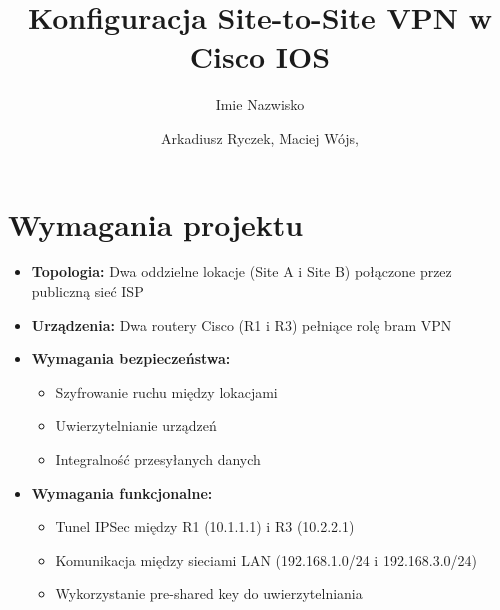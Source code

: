 \documentclass[12pt,twoside,a4paper,openany]{article}
\title{Konfiguracja Site-to-Site VPN w Cisco IOS}		%
\author{Imie Nazwisko}
\author{Arkadiusz Ryczek, Maciej Wójs,  }
\begin{document}
\renewcommand{\figurename}{Rys.}    %
\renewcommand{\tablename}{Tab.}     %
\thispagestyle{empty}               %
\stronatytulowa                     %


\pagestyle{fancy}
\newpage

\renewcommand{\cftbeforesecskip}{8pt}
\renewcommand{\cftsecafterpnum}{\vskip 8pt}
\renewcommand{\cftparskip}{3pt}
\renewcommand{\cfttoctitlefont}{\Large\bfseries\sffamily}
\renewcommand{\cftsecfont}{\bfseries\sffamily}
\renewcommand{\cftsubsecfont}{\sffamily}
\renewcommand{\cftsubsubsecfont}{\sffamily}
\renewcommand{\cftparafont}{\sffamily}

\tableofcontents    %
\thispagestyle{fancy}
\newpage

\section{Wymagania projektu}
\begin{itemize}
\item \textbf{Topologia:} Dwa oddzielne lokacje (Site A i Site B) połączone przez publiczną sieć ISP
\item \textbf{Urządzenia:} Dwa routery Cisco (R1 i R3) pełniące rolę bram VPN
\item \textbf{Wymagania bezpieczeństwa:}
  \begin{itemize}
  \item Szyfrowanie ruchu między lokacjami
  \item Uwierzytelnianie urządzeń
  \item Integralność przesyłanych danych
  \end{itemize}
\item \textbf{Wymagania funkcjonalne:}
  \begin{itemize}
  \item Tunel IPSec między R1 (10.1.1.1) i R3 (10.2.2.1)
  \item Komunikacja między sieciami LAN (192.168.1.0/24 i 192.168.3.0/24)
  \item Wykorzystanie pre-shared key do uwierzytelniania
  \end{itemize}
\end{itemize}
\end{document}
